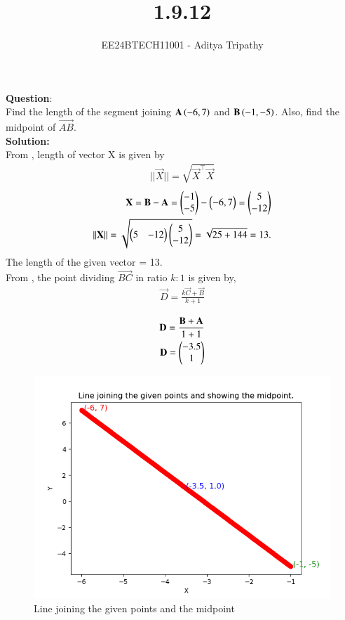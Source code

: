 \documentclass[journal]{IEEEtran}
\begin{document}

\vspace{3cm}

\title{1.9.12}
\author{EE24BTECH11001 - Aditya Tripathy
}
 \maketitle
{\let\newpage\relax\maketitle}

\renewcommand{\thefigure}{\theenumi}
\renewcommand{\thetable}{\theenumi}
\setlength{\intextsep}{10pt} %


\renewcommand{\thetable}{\theenumi}


\textbf{Question}:\\
Find the length of the segment joining $\mathbf{A}\left(-6,7\right)$ and $\mathbf{B}\left(-1,-5\right)$. Also, find the midpoint of $\vec{AB}$.
\\
\textbf{Solution: }\\
From , length of vector X is given by
\begin{align} 
    ||\vec{X}|| = \sqrt{\vec{X}^\top \vec{X}}
\end{align}
\begin{align}
    \mathbf{X} = \mathbf{B} - \mathbf{A} = \begin{pmatrix}-1 \\ -5\end{pmatrix} - \begin{pmatrix}-6 , 7\end{pmatrix} = \begin{pmatrix}5 \\ -12\end{pmatrix}\\
    ||\mathbf{X}|| = \sqrt{\begin{pmatrix}5 & -12\end{pmatrix}\begin{pmatrix}5 \\ -12\end{pmatrix}} = \sqrt{25 + 144} = 13.\\
\end{align}
The length of the given vector = 13.\\
From , the point dividing $\vec{BC}$ in ratio $k:1$ is given by,
\begin{align}
    \vec{D} = \frac{k\vec{C}+\vec{B}}{k+1}\\
\end{align}
\begin{align}
    \mathbf{D} = \frac{\mathbf{B}+\mathbf{A}}{1+1} \\
    \mathbf{D} = \begin{pmatrix}-3.5 \\ 1\end{pmatrix}
\end{align}
    
\begin{figure}[h!]
   \centering
   \includegraphics[width=0.7\linewidth]{figs/fig.png}
   \caption{Line joining the given points and the midpoint}
\end{figure}
\end{document}

